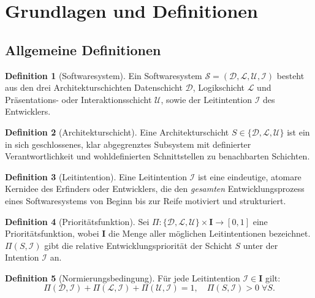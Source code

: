 ﻿\documentclass[a4paper,12pt]{article}
\theoremstyle{definition}
\newtheorem{definition}{Definition}
\begin{document}
\section{Grundlagen und Definitionen}

\subsection{Allgemeine Definitionen}

\begin{definition}[Softwaresystem]
Ein Softwaresystem $\mathcal{S} = (\mathcal{D}, \mathcal{L}, \mathcal{U},
\mathcal{I})$ besteht aus den drei Architekturschichten Datenschicht
$\mathcal{D}$, Logikschicht $\mathcal{L}$ und Präsentations- oder
Interaktionsschicht $\mathcal{U}$, sowie der Leitintention $\mathcal{I}$
des Entwicklers.
\end{definition}

\begin{definition}[Architekturschicht]
Eine Architekturschicht $S \in \{\mathcal{D}, \mathcal{L}, \mathcal{U}\}$
ist ein in sich geschlossenes, klar abgegrenztes Subsystem mit definierter
Verantwortlichkeit und wohldefinierten Schnittstellen zu benachbarten Schichten.
\end{definition}

\begin{definition}[Leitintention]
Eine Leitintention $\mathcal{I}$ ist eine eindeutige, atomare Kernidee
des Erfinders oder Entwicklers, die den \emph{gesamten} Entwicklungsprozess
eines Softwaresystems von Beginn bis zur Reife motiviert und strukturiert.
\end{definition}

\begin{definition}[Prioritätsfunktion]
Sei $\Pi: \{\mathcal{D}, \mathcal{L}, \mathcal{U}\} \times \mathbf{I}
\to [0,1]$ eine Prioritätsfunktion, wobei $\mathbf{I}$ die Menge aller
möglichen Leitintentionen bezeichnet. $\Pi(S, \mathcal{I})$ gibt die
relative Entwicklungspriorität der Schicht $S$ unter der Intention
$\mathcal{I}$ an.
\end{definition}

\begin{definition}[Normierungsbedingung]
Für jede Leitintention $\mathcal{I} \in \mathbf{I}$ gilt:
\[
\Pi(\mathcal{D}, \mathcal{I}) + \Pi(\mathcal{L}, \mathcal{I}) +
\Pi(\mathcal{U}, \mathcal{I}) = 1, \quad
\Pi(S, \mathcal{I}) > 0 \;\forall S.
\]
\end{definition}
\end{document}
